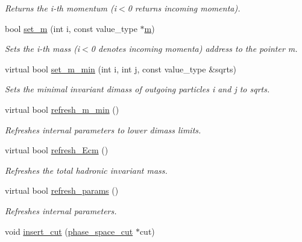 \begin{DoxyCompactItemize}
\begin{DoxyCompactList}\small\item\em Returns the i-\/th momentum (i$<$0 returns incoming momenta). \end{DoxyCompactList}\item 
bool \hyperlink{a00441_a35eff1ece24702ed67b4fbc30e703283}{set\-\_\-m} (int i, const value\-\_\-type $\ast$\hyperlink{a00442_a3a9390d5b0f36b7778161963c43843b0}{m})
\begin{DoxyCompactList}\small\item\em Sets the i-\/th mass (i$<$0 denotes incoming momenta) address to the pointer m. \end{DoxyCompactList}\item 
virtual bool \hyperlink{a00441_af0547a26ceb1704830b86164e6d69f0e}{set\-\_\-m\-\_\-min} (int i, int j, const value\-\_\-type \&sqrts)
\begin{DoxyCompactList}\small\item\em Sets the minimal invariant dimass of outgoing particles i and j to sqrts. \end{DoxyCompactList}\item 
\hypertarget{a00441_a141207a1e9163c12d8b75caa57e0a46d}{virtual bool \hyperlink{a00441_a141207a1e9163c12d8b75caa57e0a46d}{refresh\-\_\-m\-\_\-min} ()}\label{a00441_a141207a1e9163c12d8b75caa57e0a46d}

\begin{DoxyCompactList}\small\item\em Refreshes internal parameters to lower dimass limits. \end{DoxyCompactList}\item 
\hypertarget{a00441_aefde619f51ccda518fe32dbf7ee6c4ed}{virtual bool \hyperlink{a00441_aefde619f51ccda518fe32dbf7ee6c4ed}{refresh\-\_\-\-Ecm} ()}\label{a00441_aefde619f51ccda518fe32dbf7ee6c4ed}

\begin{DoxyCompactList}\small\item\em Refreshes the total hadronic invariant mass. \end{DoxyCompactList}\item 
\hypertarget{a00441_afd23d61edd4e4348d18d3e95ffd8863a}{virtual bool \hyperlink{a00441_afd23d61edd4e4348d18d3e95ffd8863a}{refresh\-\_\-params} ()}\label{a00441_afd23d61edd4e4348d18d3e95ffd8863a}

\begin{DoxyCompactList}\small\item\em Refreshes internal parameters. \end{DoxyCompactList}\item 
\hypertarget{a00441_ac77e2f7c267dff6a67e36334a15646e4}{void \hyperlink{a00441_ac77e2f7c267dff6a67e36334a15646e4}{insert\-\_\-cut} (\hyperlink{a00413}{phase\-\_\-space\-\_\-cut} $\ast$cut)}\label{a00441_ac77e2f7c267dff6a67e36334a15646e4}


\end{DoxyCompactItemize}
